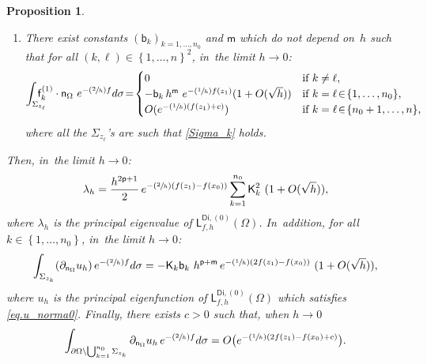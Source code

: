 \documentclass[10pt]{amsart}
\newcommand{\Psfrac}[2]{(\sfrac{#1}{#2})}
\let\lp\langle
\let\rp\rangle
\let\ve\varepsilon
\theoremstyle{plain}
\newtheorem{proposition}{Proposition}
\theoremstyle{definition}
\let\oldbigcup\bigcup
\begin{document}
\begin{proposition}
\begin{enumerate}
\begin{enumerate}
\begin{equation*}
\big \lp \nabla\mathsf u^{(0)}, \mathsf f_k^{(1)}\big\rp_{L^2_w(\Omega)} = \mathsf K_k\ h^{\mathsf p} e^{-\Psfrac{1}{h}(f(z_1)- f(x_0))} \ (1 + O(\sqrt h)),
\end{equation*}
where we recall $f(z_k)=f(z_1)$ for $k=1,\dots,n_0$. If~$k>n_0$, it~holds for $h$ small enough:
\begin{equation*}
\big \vert \big \lp \nabla\mathsf u^{(0)}, \mathsf f_k^{(1)}\big\rp_{L^2_w(\Omega)} \big \vert \le e^{-\Psfrac{1}{h}(f(z_1)- f(x_0) +\ve)}.
\end{equation*}
\item\label{ESTIME4b}
There exist constants $(\mathsf b_k)_{k=1,\dots,n_0}$ and $\mathsf m$ which do not depend on~$h$ such that for all $ (k,\ell)
\in \left\{1,\ldots,n\right\}^2$, in~the limit $h\to 0$:
\begin{equation*}
\int_{\Sigma_{z_\ell}} \!\!\! \!\!\! \mathsf
f_k^{(1)} \cdot \mathsf n_\Omega \ e^{-\Psfrac{2}{h} f} d\sigma
\!=\! \begin{cases} 0 & \text{if } k\neq \ell,\\
- \mathsf b_k \, h^{\mathsf m } \ e^{-\Psfrac{1}{h} f(z_1)} (1 + O(\sqrt h)) & \text{if } k=\ell \!\in\! \{1,\dots,n_0\}, \\
O(e^{-\Psfrac 1h (f(z_1) +c)}) & \text{if } k=\ell \!\in\! \{n_0+1,\ldots,n\},
\end{cases}
\end{equation*}
where all the $\Sigma_{z_\ell}$'s are such that \eqref{Sigma_k} holds.
\end{enumerate}
\end{enumerate}
Then, in~the limit $h\to 0$:
\[
\lambda_h=\frac{h^{2\mathsf p+1}}{2} \, e^{-\Psfrac{2}{h}(f(z_1)- f(x_0))} \sum_{k=1}^{n_0} \mathsf K_k^2 \ (1 + O(\sqrt h)),
\]
where $\lambda_h$ is the principal eigenvalue of $\mathsf L^{\mathsf{Di},(0)}_{f,h}(\Omega)$. In~addition, for all $k\in \left\{1,\ldots,n_0\right\}$, in~the limit $h\to 0$:
\begin{equation*}
\int_{\Sigma_{z_k}} (\partial_{\mathsf n_\Omega} u_h)\, e^{-\Psfrac{2}{h}f} d\sigma = -\mathsf K_k \mathsf b_k \ h^{\mathsf p+\mathsf m} \, e^{-\Psfrac{1}{h}(2f(z_1)- f(x_0))} \ (1+ O(\sqrt h)),
\end{equation*}
where $u_h$ is the principal eigenfunction of $\mathsf L^{\mathsf{Di},(0)}_{f,h}(\Omega)$ which satisfies \eqref{eq.u_norma0}. Finally, there exists $c>0$ such that, when $h\to 0$
\[
\int_{\partial \Omega \setminus \oldbigcup_{k=1}^{n_0}\Sigma_{z_k}} \partial_{\mathsf n_\Omega} u_h \, e^{-\Psfrac{2}{h} f} d\sigma= O\bigl(e^{-\Psfrac{1}{h}(2f(z_1)-f(x_0)+c)} \bigr).
\]
\end{proposition}
\end{document}
